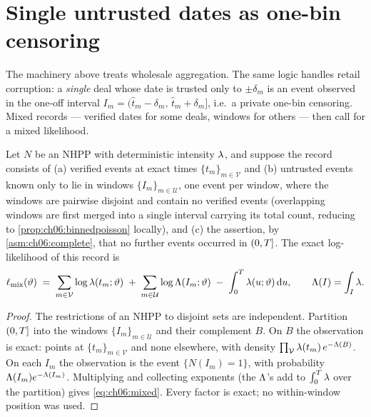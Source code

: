 \section{Single untrusted dates as one-bin censoring}\label{ch06:sec:onebin}

The machinery above treats wholesale aggregation. The same logic handles
retail corruption: a \emph{single} deal whose date is trusted only to
$\pm\delta_m$ is an event observed in the one-off interval
$I_m = (\hat t_m - \delta_m,\, \hat t_m + \delta_m]$, i.e.\ a private
one-bin censoring. Mixed records --- verified dates for some deals,
windows for others --- then call for a mixed likelihood.

\begin{proposition}\label{prop:ch06:mixedpoisson}
Let $N$ be an NHPP with deterministic intensity $\lambda$, and suppose the
record consists of (a) verified events at exact times
$\{t_m\}_{m\in\mathcal{V}}$ and (b) untrusted events known only to lie in
windows $\{I_m\}_{m\in\mathcal{U}}$, one event per window, where the
windows are pairwise disjoint and contain no verified events (overlapping
windows are first merged into a single interval carrying its total count,
reducing to \cref{prop:ch06:binnedpoisson} locally), and (c) the assertion,
by \cref{asm:ch06:complete}, that no further events occurred in
$(0,T]$. The exact log-likelihood of this record is
\begin{equation}\label{eq:ch06:mixed}
\ell_{\mathrm{mix}}(\vartheta)
 \;=\;
 \sum_{m\in\mathcal{V}} \log\lambda(t_m;\vartheta)
 \;+\;
 \sum_{m\in\mathcal{U}} \log \Lambda(I_m;\vartheta)
 \;-\;
 \int_0^{T}\lambda(u;\vartheta)\,\mathrm{d} u,
\qquad
\Lambda(I) = \int_I \lambda .
\end{equation}
\end{proposition}

\begin{proof}
The restrictions of an NHPP to disjoint sets are independent. Partition
$(0,T]$ into the windows $\{I_m\}_{m\in\mathcal U}$ and their
complement $B$. On $B$ the observation is exact: points at
$\{t_m\}_{m\in\mathcal V}$ and none elsewhere, with density
$\prod_{\mathcal V}\lambda(t_m)\, e^{-\Lambda(B)}$. On each $I_m$ the
observation is the event $\{N(I_m)=1\}$, with probability
$\Lambda(I_m)e^{-\Lambda(I_m)}$. Multiplying and collecting exponents (the
$\Lambda$'s add to $\int_0^{T}\lambda$ over the partition) gives
\cref{eq:ch06:mixed}. Every factor is exact; no within-window position was
used.
\end{proof}

